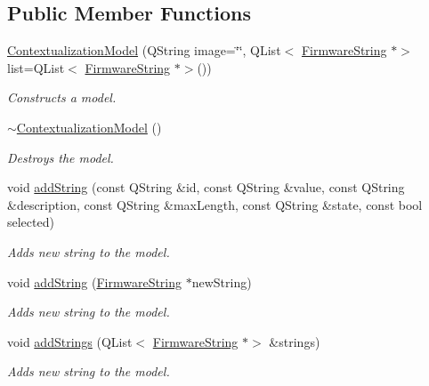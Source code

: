 \subsection*{Public Member Functions}
\begin{DoxyCompactItemize}
\item 
\mbox{\hyperlink{classContextualizationModel_a109126afb677af159e77adecf36fb6f2}{Contextualization\+Model}} (Q\+String image=\char`\"{}\char`\"{}, Q\+List$<$ \mbox{\hyperlink{classFirmwareString}{Firmware\+String}} $\ast$$>$ list=Q\+List$<$ \mbox{\hyperlink{classFirmwareString}{Firmware\+String}} $\ast$$>$())
\begin{DoxyCompactList}\small\item\em Constructs a model. \end{DoxyCompactList}\item 
\mbox{\label{classContextualizationModel_a232b273faa1bdb051c7a7f61d6601370}} 
\mbox{\hyperlink{classContextualizationModel_a232b273faa1bdb051c7a7f61d6601370}{$\sim$\+Contextualization\+Model}} ()
\begin{DoxyCompactList}\small\item\em Destroys the model. \end{DoxyCompactList}\item 
void \mbox{\hyperlink{classContextualizationModel_aa87bafc64440304e8d9efd7f23f9b897}{add\+String}} (const Q\+String \&id, const Q\+String \&value, const Q\+String \&description, const Q\+String \&max\+Length, const Q\+String \&state, const bool selected)
\begin{DoxyCompactList}\small\item\em Adds new string to the model. \end{DoxyCompactList}\item 
void \mbox{\hyperlink{classContextualizationModel_aad4004198e03fb3e9bba770f0f76489e}{add\+String}} (\mbox{\hyperlink{classFirmwareString}{Firmware\+String}} $\ast$new\+String)
\begin{DoxyCompactList}\small\item\em Adds new string to the model. \end{DoxyCompactList}\item 
void \mbox{\hyperlink{classContextualizationModel_a24021cc16a5215c9765602b311fe9f77}{add\+Strings}} (Q\+List$<$ \mbox{\hyperlink{classFirmwareString}{Firmware\+String}} $\ast$$>$ \&strings)
\begin{DoxyCompactList}\small\item\em Adds new string to the model. \end{DoxyCompactList}\item 
$$
\end{DoxyCompactItemize}

